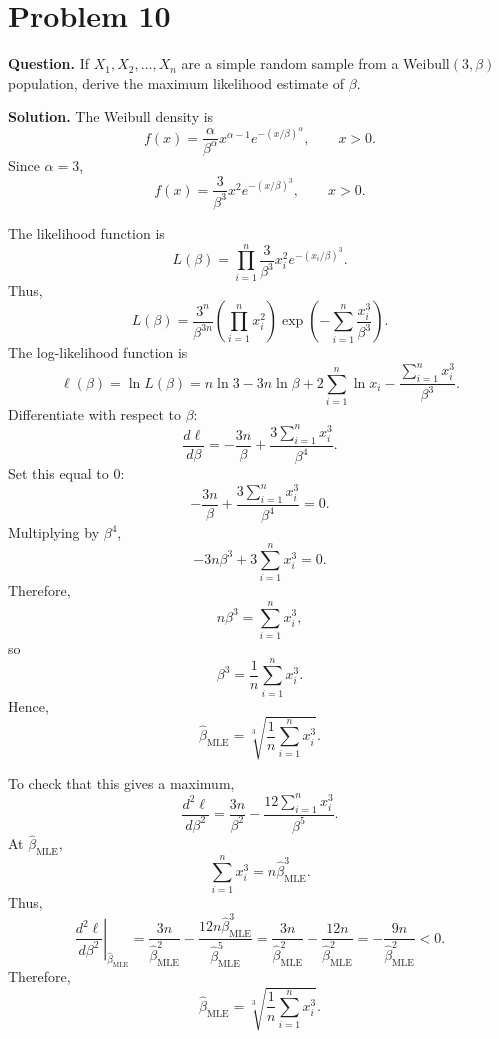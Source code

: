 \documentclass[11pt]{article}
\begin{document}
\section*{Problem 10}

\textbf{Question.} If $X_1,X_2,\ldots,X_n$ are a simple random sample from a Weibull$(3,\beta)$ population, derive the maximum likelihood estimate of $\beta$.

\textbf{Solution.} The Weibull density is
\[
f(x)=\frac{\alpha}{\beta^\alpha}x^{\alpha-1}e^{-(x/\beta)^\alpha}, \qquad x>0.
\]
Since $\alpha=3$,
\[
f(x)=\frac{3}{\beta^3}x^2e^{-(x/\beta)^3}, \qquad x>0.
\]

The likelihood function is
\[
L(\beta)=\prod_{i=1}^{n}\frac{3}{\beta^3}x_i^2e^{-(x_i/\beta)^3}.
\]
Thus,
\[
L(\beta)=\frac{3^n}{\beta^{3n}}\left(\prod_{i=1}^{n}x_i^2\right)\exp\left(-\sum_{i=1}^{n}\frac{x_i^3}{\beta^3}\right).
\]
The log-likelihood function is
\[
\ell(\beta)=\ln L(\beta)=n\ln 3-3n\ln\beta+2\sum_{i=1}^{n}\ln x_i-\frac{\sum_{i=1}^{n}x_i^3}{\beta^3}.
\]
Differentiate with respect to $\beta$:
\[
\frac{d\ell}{d\beta}=-\frac{3n}{\beta}+\frac{3\sum_{i=1}^{n}x_i^3}{\beta^4}.
\]
Set this equal to $0$:
\[
-\frac{3n}{\beta}+\frac{3\sum_{i=1}^{n}x_i^3}{\beta^4}=0.
\]
Multiplying by $\beta^4$,
\[
-3n\beta^3+3\sum_{i=1}^{n}x_i^3=0.
\]
Therefore,
\[
n\beta^3=\sum_{i=1}^{n}x_i^3,
\]
so
\[
\beta^3=\frac{1}{n}\sum_{i=1}^{n}x_i^3.
\]
Hence,
\[
\hat\beta_{\text{MLE}}=\sqrt[3]{\frac{1}{n}\sum_{i=1}^{n}x_i^3}.
\]

To check that this gives a maximum,
\[
\frac{d^2\ell}{d\beta^2}=\frac{3n}{\beta^2}-\frac{12\sum_{i=1}^{n}x_i^3}{\beta^5}.
\]
At $\hat\beta_{\text{MLE}}$,
\[
\sum_{i=1}^{n}x_i^3=n\hat\beta_{\text{MLE}}^3.
\]
Thus,
\[
\left.\frac{d^2\ell}{d\beta^2}\right|_{\hat\beta_{\text{MLE}}}
=\frac{3n}{\hat\beta_{\text{MLE}}^2}-\frac{12n\hat\beta_{\text{MLE}}^3}{\hat\beta_{\text{MLE}}^5}
=\frac{3n}{\hat\beta_{\text{MLE}}^2}-\frac{12n}{\hat\beta_{\text{MLE}}^2}
=-\frac{9n}{\hat\beta_{\text{MLE}}^2}<0.
\]
Therefore,
\[
\boxed{\hat\beta_{\text{MLE}}=\sqrt[3]{\frac{1}{n}\sum_{i=1}^{n}x_i^3}}.
\]

\newpage
\end{document}
